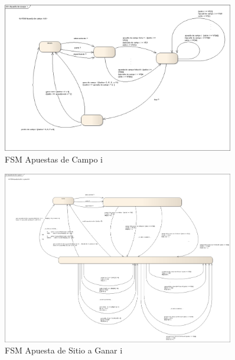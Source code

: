         \begin{figure}[p!hbt]
		\centering
		\includegraphics[angle=90, width=0.9\textwidth]{../img/FSM_ApuestaDeCampo}
		\caption{FSM Apuestas de Campo i }
		\label{fig:apDeCampo}
	\end{figure}



        \begin{figure}[p!hbt]
		\centering
		\includegraphics[angle=90, width=0.9\textwidth]{../img/FSM_ApuestaDeSitioAGanar.png}
		\caption{FSM Apuesta de Sitio a Ganar i}
		\label{fig:apSitioAGanar}
	\end{figure}



